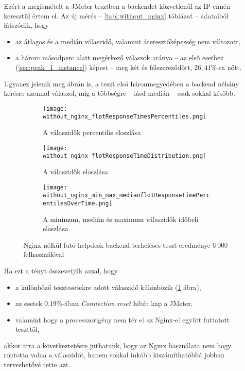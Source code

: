Ezért a megismételt a JMeter tesztben a backendet közvetlenül az IP-címén keresztül értem el. Az új mérés --  \ref{tabl:without_nginx} táblázat --   adataiból látszódik, hogy

\begin{itemize}
	\item az átlagos és a medián válaszidő, valamint áteresztőképesség nem változott,
	\item a három másodperc alatt megérkező válaszok aránya --  az első esethez (\ref{sec:peak_1_instance}) képest --   meg két és félszereződött, $26,41\%$-ra nőtt.
\end{itemize}



Ugyanez jelenik meg  ábrán is, a teszt első háromnegyedében a backend néhány kérésre azonnal válaszol, míg a többségre --  lásd medián --   csak sokkal később.

\begin{figure}[hbt]
	\begin{subfigure}{.49\textwidth}
		\centering
		\texttt{[image: without\_nginx\_flotResponseTimesPercentiles.png]}  
		\caption{A válaszidők percentilis eloszlása}
		\label{fig:without_nginx_percentil}
	\end{subfigure}
	\begin{subfigure}{.49\textwidth}
		\centering
		\texttt{[image: without\_nginx\_flotResponseTimeDistribution.png]}  
		\caption{A válaszidők eloszlása}
	\end{subfigure}
	
	\quad
	
	\begin{subfigure}{.95\textwidth}
		\centering
		\texttt{[image: without\_nginx\_min\_max\_medianflotResponseTimePercentilesOverTime.png]}  
		\caption{A minimum, medián és maximum válaszidők időbeli eloszlása}
		\label{fig:without_nginx_min_median_max_over_time}
	\end{subfigure}
	
	\caption[Helpdesk backend terheléses teszt Nginx nélkül]{Nginx nélkül futó helpdesk backend terheléses teszt eredménye $6~000$ felhasználóval}
\end{figure}


Ha ezt a tényt összevetjük azzal, hogy
\begin{itemize}
	\item a különböző tesztesetekre adott válaszidő különbözik (\ref{fig:without_nginx_percentil} ábra),
	\item az esetek 0.19\%-ában \textit{Connection reset} hibát kap a JMeter,
	\item valamint hogy a processzorigény nem tér el az Nginx-el együtt futtatott teszttől,
\end{itemize}
akkor arra a következtetésre juthatunk, hogy az Nginx használata nem hogy rontotta volna a válaszidőt, hanem sokkal inkább kiszámíthatóbbá jobban tervezhetővé tette azt.


